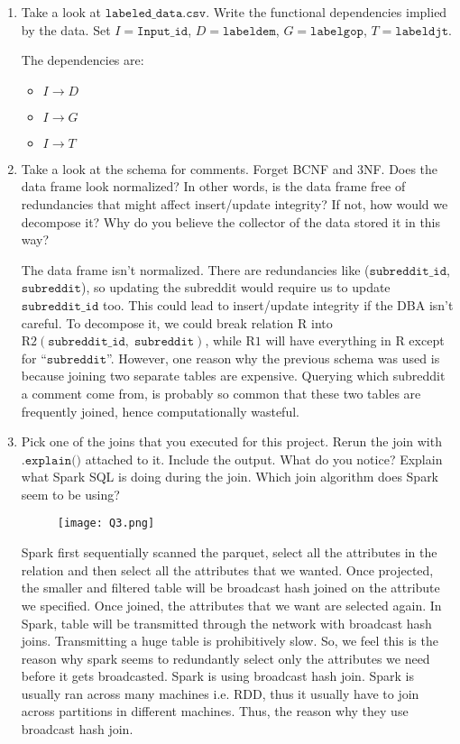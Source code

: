 \documentclass[11pt]{article}
\begin{document}
\begin{enumerate}
\item Take a look at $\texttt{labeled\_data.csv}$. Write the functional dependencies implied by the data.
    Set $I=\texttt{Input\_id}$, $D=\texttt{labeldem}$, $G=\texttt{labelgop}$, $T=\texttt{labeldjt}$.

    The dependencies are:
    \begin{itemize}
        \item  $I \rightarrow D$
        \item  $I \rightarrow G$
        \item  $I \rightarrow T$
\end{itemize}

\item Take a look at the schema for comments. Forget BCNF and 3NF. Does the data frame look normalized? In other words, is the data frame free of redundancies that might affect insert/update integrity? If not, how would we decompose it? Why do you believe the collector of the data stored it in this way?

    The data frame isn’t normalized. There are redundancies like ($\texttt{subreddit\_id}$, $\texttt{subreddit}$), so updating the subreddit would require us to update $\texttt{subreddit\_id}$ too. This could lead to insert/update integrity if the DBA isn’t careful. 
	To decompose it, we could break relation R into $\text{R2}(\texttt{subreddit\_id},\; \texttt{subreddit})$, while $\text{R1}$ will have everything in R except for “$\texttt{subreddit}$”. 
    However, one reason why the previous schema was used is because joining two separate tables are expensive. Querying which subreddit a comment come from, is probably so common that these two tables are frequently joined, hence computationally wasteful. 

\item Pick one of the joins that you executed for this project. Rerun the join with $\texttt{.explain()}$ attached to it. Include the output. What do you notice? Explain what Spark SQL is doing during the join. Which join algorithm does Spark seem to be using?

\begin{figure}[H]
    \begin{center}
  \texttt{[image: Q3.png]}
    \end{center}
\end{figure}
    Spark first sequentially scanned the parquet, select all the attributes in the relation and then select all the attributes that we wanted. Once projected, the smaller and filtered table will be broadcast hash joined on the attribute we specified. Once joined, the attributes that we want are selected again.
    In Spark, table will be transmitted through the network with broadcast hash joins. Transmitting a huge table is prohibitively slow. So, we feel this is the reason why spark seems to redundantly select only the attributes we need before it gets broadcasted.
    Spark is using broadcast hash join. Spark is usually ran across many machines i.e. RDD, thus it usually have to join across partitions in different machines. Thus, the reason why they use broadcast hash join.  


\end{enumerate}
\end{document}
